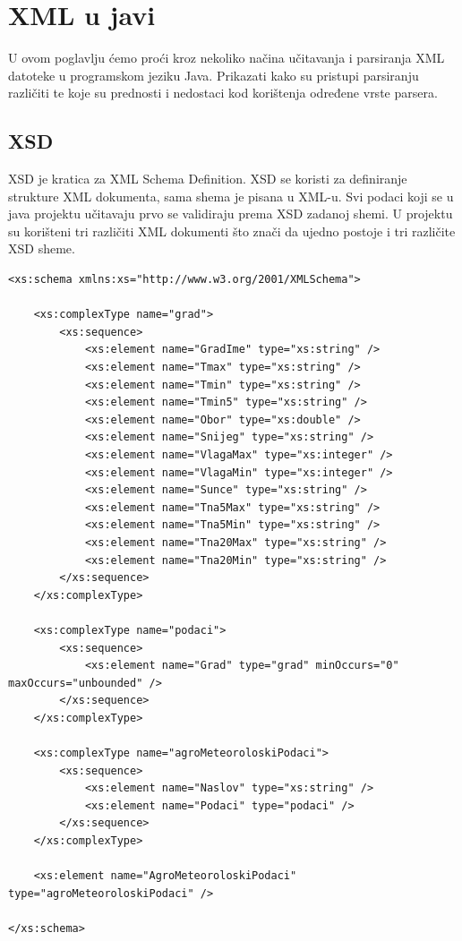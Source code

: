 \documentclass{foi}
\begin{document}
\chapter{XML u javi}
U ovom poglavlju ćemo proći kroz nekoliko načina učitavanja i parsiranja XML datoteke
u programskom jeziku Java. Prikazati kako su pristupi parsiranju različiti te koje su
prednosti i nedostaci kod korištenja određene vrste parsera.

\section{XSD}
XSD je kratica za XML Schema Definition. XSD se koristi za definiranje strukture XML
dokumenta, sama shema je pisana u XML-u.
Svi podaci koji se u java projektu učitavaju prvo se validiraju prema XSD zadanoj shemi.
U projektu su korišteni tri različiti XML dokumenti što znači da ujedno postoje i
tri različite XSD sheme.

\begin{lstlisting}[caption={Primjer XSD dokumenta za sedmodnevnu prognozu vremena}]
<xs:schema xmlns:xs="http://www.w3.org/2001/XMLSchema">

    <xs:complexType name="grad">
        <xs:sequence>
            <xs:element name="GradIme" type="xs:string" />
            <xs:element name="Tmax" type="xs:string" />
            <xs:element name="Tmin" type="xs:string" />
            <xs:element name="Tmin5" type="xs:string" />
            <xs:element name="Obor" type="xs:double" />
            <xs:element name="Snijeg" type="xs:string" />
            <xs:element name="VlagaMax" type="xs:integer" />
            <xs:element name="VlagaMin" type="xs:integer" />
            <xs:element name="Sunce" type="xs:string" />
            <xs:element name="Tna5Max" type="xs:string" />
            <xs:element name="Tna5Min" type="xs:string" />
            <xs:element name="Tna20Max" type="xs:string" />
            <xs:element name="Tna20Min" type="xs:string" />
        </xs:sequence>
    </xs:complexType>

    <xs:complexType name="podaci">
        <xs:sequence>
            <xs:element name="Grad" type="grad" minOccurs="0" maxOccurs="unbounded" />
        </xs:sequence>
    </xs:complexType>

    <xs:complexType name="agroMeteoroloskiPodaci">
        <xs:sequence>
            <xs:element name="Naslov" type="xs:string" />
            <xs:element name="Podaci" type="podaci" />
        </xs:sequence>
    </xs:complexType>

    <xs:element name="AgroMeteoroloskiPodaci" type="agroMeteoroloskiPodaci" />

</xs:schema>
\end{lstlisting}
\end{document}

